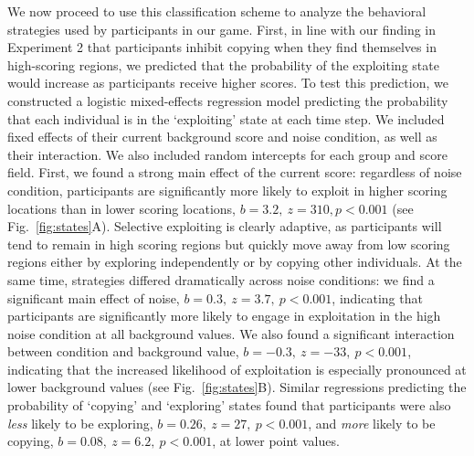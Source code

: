 \documentclass[12pt,letterpaper]{article}
\begin{document}
We now proceed to use this classification scheme to analyze the behavioral strategies used by participants in our game.
First, in line with our finding in Experiment 2 that participants inhibit copying when they find themselves in high-scoring regions, we predicted that the probability of the exploiting state would increase as participants receive higher scores.  
To test this prediction, we constructed a logistic mixed-effects regression model predicting the probability that each individual is in the `exploiting' state at each time step. 
We included fixed effects of their current background score and noise condition, as well as their interaction.
We also included random intercepts for each group and score field.
First, we found a strong main effect of the current score: regardless of noise condition, participants are significantly more likely to exploit in higher scoring locations than in lower scoring locations, $b=3.2,~z=310,p<0.001$  (see Fig.~\ref{fig:states}A).
Selective exploiting is clearly adaptive, as participants will tend to remain in high scoring regions but quickly move away from low scoring regions either by exploring independently or by copying other individuals.
At the same time, strategies differed dramatically across noise conditions: we find a significant main effect of noise, $b=0.3,~z=3.7,~p<0.001$, indicating that participants are significantly more likely to engage in exploitation in the high noise condition at all background values.
We also found a significant interaction between condition and background value, $b=-0.3,~z=-33,~p<0.001$, indicating that the increased likelihood of exploitation is especially pronounced at lower background values (see Fig.~\ref{fig:states}B).
Similar regressions predicting the probability of `copying' and `exploring' states found that participants were also \emph{less} likely to be exploring, $b=0.26,~z=27,~p<0.001$, and \emph{more} likely to be copying, $b=0.08,~z=6.2,~p<0.001$, at lower point values.
\end{document}
